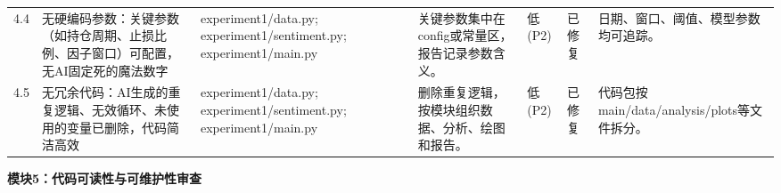 \begin{longtable}{@{}L{0.045\textwidth}L{0.190\textwidth}L{0.140\textwidth}L{0.190\textwidth}L{0.060\textwidth}L{0.060\textwidth}L{0.205\textwidth}@{}}
4.4 & 无硬编码参数：关键参数（如持仓周期、止损比例、因子窗口）可配置，无AI固定死的魔法数字 & experiment1/\allowbreak{}data.py;\allowbreak{} experiment1/\allowbreak{}sentiment.py;\allowbreak{} experiment1/\allowbreak{}main.py & 关键参数集中在config或常量区，报告记录参数含义。 & 低(P2) & 已修复 & 日期、窗口、阈值、模型参数均可追踪。 \\
4.5 & 无冗余代码：AI生成的重复逻辑、无效循环、未使用的变量已删除，代码简洁高效 & experiment1/\allowbreak{}data.py;\allowbreak{} experiment1/\allowbreak{}sentiment.py;\allowbreak{} experiment1/\allowbreak{}main.py & 删除重复逻辑，按模块组织数据、分析、绘图和报告。 & 低(P2) & 已修复 & 代码包按main/\allowbreak{}data/\allowbreak{}analysis/\allowbreak{}plots等文件拆分。 \\
\end{longtable}
\endgroup

\textbf{模块5：代码可读性与可维护性审查}

